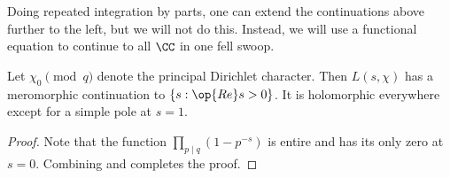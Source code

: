 \documentclass[../notes.tex]{subfiles}
\begin{document}
\begin{remark} \label{rem:ind-continue-zeta}
	Doing repeated integration by parts, one can extend the continuations above further to the left, but we will not do this. Instead, we will use a functional equation to continue to all $\CC$ in one fell swoop.
\end{remark}
\begin{corollary} \label{cor:continue-principal-char}
	Let $\chi_0\pmod q$ denote the principal Dirichlet character. Then $L(s,\chi)$ has a meromorphic continuation to $\{s:\op{Re}s>0\}$. It is holomorphic everywhere except for a simple pole at $s=1$.
\end{corollary}
\begin{proof}
	Note that the function $\prod_{p\mid q}\left(1-p^{-s}\right)$ is entire and has its only zero at $s=0$. Combining  and  completes the proof.
\end{proof}

\end{document}
